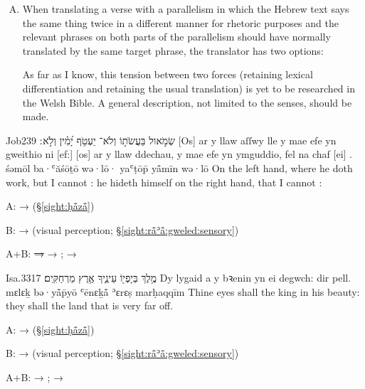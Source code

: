 \begin{enumerate}[A.]
	\item When translating a verse with a parallelism in which the Hebrew text says the same thing twice in a different manner for rhetoric purposes and the relevant phrases on both parts of the parallelism should have normally translated by the same target phrase, the translator has two options:
		As far as I know, this tension between two forces (retaining lexical differentiation and retaining the usual translation) is yet to be researched in the Welsh Bible. A general description, not limited to the senses, should be made.
\end{enumerate}

\begin{example}{Job}{23}{9}{}{}
	\quoling
	{שְׂמֹ֣אול בַּעֲשֹׂת֣וֹ וְלֹא־ יַעְטֹ֥ף יָ֝מִ֗ין וְלֹ֣א ׃}
	{[Os] ar y llaw aſſwy lle y mae efe yn gweithio ni  [ef:] [os] ar y llaw ddechau, y mae efe yn ymguddio, fel na chaf [ei] .}
	{śəmōl ba·ʿăśōṯō wə·lō· yaʿṭōp̄ yå̄mīn wə·lō }
	{On the left hand, where he doth work, but I cannot  : he hideth himself on the right hand, that I cannot  :}
\end{example}
\begin{compactdesc}
	\item[A:]  →  (§\ref{sight:ḥå̄zå̄})
	\item[B:]  →  (visual perception; §\ref{sight:rå̄ʾå̄:gweled:sensory})
	\item[A+B:]  \sout{→ } → ;  → 
\end{compactdesc}

\begin{example}{Isa.}{33}{17}{}{}
	\quoling
	{מֶ֥לֶךְ בְּיָפְי֖וֹ  עֵינֶ֑יךָ  אֶ֥רֶץ מַרְחַקִּֽים׃}
	{Dy lygaid a  y bꝛenin yn ei degwch:  dir pell.}
	{mɛlɛḵ bə·yå̄p̄yō  ʿēnɛḵå̄  ʾɛrɛṣ marḥaqqīm}
	{Thine eyes shall  the king in his beauty: they shall  the land that is very far off.}
\end{example}
\begin{compactdesc}
	\item[A:]  →  (§\ref{sight:ḥå̄zå̄})
	\item[B:]  →  (visual perception; §\ref{sight:rå̄ʾå̄:gweled:sensory})
	\item[A+B:]  → ;  → 
\end{compactdesc}
